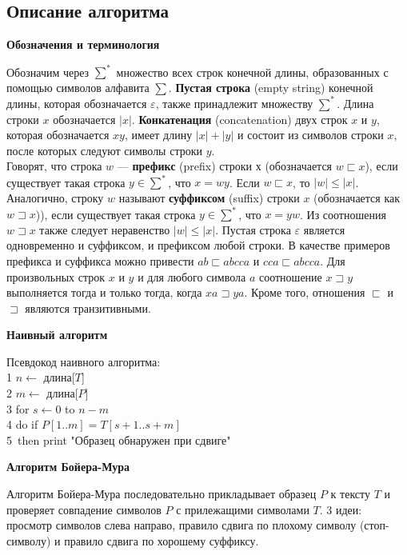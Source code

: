 \documentclass[a4paper,12pt]{article}
\begin{document}
\subsection{Описание алгоритма}
\begin{center}
\textbf{Обозначения и терминология}
\end{center}
\quad Обозначим через $\sum^*$ множество всех строк конечной длины, образованных с помощью символов алфавита $\sum$. \textbf{Пустая строка} (empty string) конечной длины, которая обозначается $\varepsilon$, также принадлежит множеству $\sum^*$. Длина строки $x$ обозначается $|x|$. \textbf{Конкатенация} (concatenation) двух строк $x$ и $y$, которая обозначается $xy$, имеет длину $|x| + |y|$ и состоит из символов строки $x$, после которых следуют символы строки $y$.  \\
Говорят, что строка $w$ — \textbf{префикс} (prefix) строки $х$ (обозначается $w \sqsubset x$), если существует такая строка $y \in \sum^*$, что $x = wy$. Если $w \sqsubset x$, то $|w| \leqslant |x|$. Аналогично, строку $w$ называют \textbf{суффиксом} (suffix) строки $x$ (обозначается как $w \sqsupset x$)), если существует такая строка $y \in \sum^*$, что $x = yw$. Из соотношения $w \sqsupset x$ также следует неравенство $|w| \leqslant |x|$. Пустая строка $\varepsilon$ является одновременно и суффиксом, и префиксом любой строки. В качестве примеров префикса и суффикса можно привести $ab \sqsubset abcca$ и $cca \sqsubset abcca$. Для произвольных строк $x$ и $y$ и для любого символа $a$ соотношение $x \sqsupset y$ выполняется тогда и только тогда, когда $xa \sqsupset ya$. Кроме того, отношения $\sqsubset$ и $\sqsupset$ являются транзитивными.
\begin{center}
\textbf{Наивный алгоритм}
\end{center}
Псевдокод наивного алгоритма:\\
1 $n \leftarrow$ длина[$T$]\\
2 $m \leftarrow$ длина[$P$]\\
3 for $s \leftarrow 0$ to $n - m$\\
4 \quad do if $P[1..m] = T[s + 1..s + m]$\\
5 \quad\,\quad then print "Образец обнаружен при сдвиге"\\
\begin{center}
\textbf{Алгоритм Бойера-Мура}
\end{center}
Алгоритм Бойера-Мура последовательно прикладывает образец $P$ к тексту $T$ и проверяет совпадение символов $P$ с прилежащими символами $T$. 3 идеи: просмотр символов слева направо, правило сдвига по плохому символу (стоп-символу) и правило сдвига по хорошему суффиксу. \\
\end{document}
